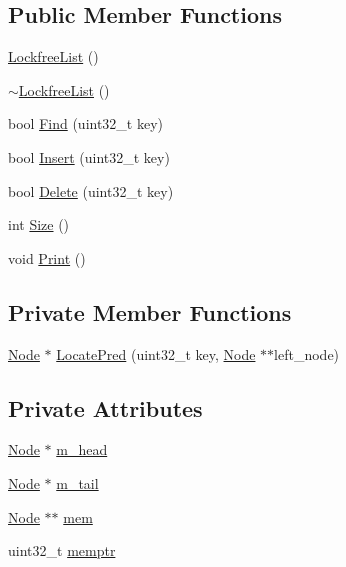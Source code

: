 \subsection*{Public Member Functions}
\begin{DoxyCompactItemize}
\item 
\hyperlink{classLockfreeList_a4e085e078f3754523dc9db091180126b}{Lockfree\-List} ()
\item 
\hyperlink{classLockfreeList_aed286204e99c8ba76697234249be1707}{$\sim$\-Lockfree\-List} ()
\item 
bool \hyperlink{classLockfreeList_a7d38019611926c6dde4c2b2a85e0d68a}{Find} (uint32\-\_\-t key)
\item 
bool \hyperlink{classLockfreeList_a8177923608d471f9fddab408d7217994}{Insert} (uint32\-\_\-t key)
\item 
bool \hyperlink{classLockfreeList_a8be9fbf09485d88165f5a3ff614bb121}{Delete} (uint32\-\_\-t key)
\item 
int \hyperlink{classLockfreeList_a86185dd4f9a662d83792eb5bd80f6968}{Size} ()
\item 
void \hyperlink{classLockfreeList_a49a330294125943db10ab3789548d3a6}{Print} ()
\end{DoxyCompactItemize}
\subsection*{Private Member Functions}
\begin{DoxyCompactItemize}
\item 
\hyperlink{structLockfreeList_1_1Node}{Node} $\ast$ \hyperlink{classLockfreeList_ad06b1c38c8c92b50e29876fe8d1738c3}{Locate\-Pred} (uint32\-\_\-t key, \hyperlink{structLockfreeList_1_1Node}{Node} $\ast$$\ast$left\-\_\-node)
\end{DoxyCompactItemize}
\subsection*{Private Attributes}
\begin{DoxyCompactItemize}
\item 
\hyperlink{structLockfreeList_1_1Node}{Node} $\ast$ \hyperlink{classLockfreeList_a1039f9c5ce94463555ec3c96080ad344}{m\-\_\-head}
\item 
\hyperlink{structLockfreeList_1_1Node}{Node} $\ast$ \hyperlink{classLockfreeList_a9965c7959a27ff3decb833f6b4c85bf4}{m\-\_\-tail}
\item 
\hyperlink{structLockfreeList_1_1Node}{Node} $\ast$$\ast$ \hyperlink{classLockfreeList_af8e0b9af4426caadf57a71a76f49dcdf}{mem}
\item 
uint32\-\_\-t \hyperlink{classLockfreeList_a78e6c8b4f10d02a43b6a4c75e383496a}{memptr}
\end{DoxyCompactItemize}



